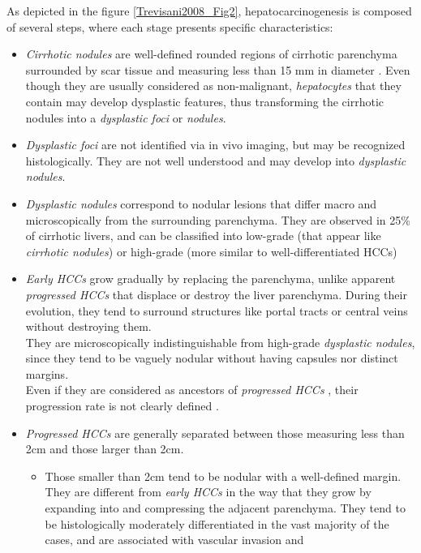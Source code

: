 As depicted in the figure \ref{Trevisani2008_Fig2}, hepatocarcinogenesis is composed of
several steps, where each stage presents specific characteristics:
\begin{itemize}
\item \emph{Cirrhotic nodules} are well-defined rounded regions of cirrhotic
  parenchyma surrounded by scar tissue and measuring less than 15 mm in
  diameter \cite{Zimmermann1995}. Even though they are
  usually considered as non-malignant, \emph{hepatocytes} that they
  contain may develop dysplastic features, thus transforming the
  cirrhotic nodules into a \emph{dysplastic foci} or \emph{nodules}.
\item \emph{Dysplastic foci} are not identified via in vivo imaging, but may
  be recognized histologically. They are not well understood and may
  develop into \emph{dysplastic nodules}.
\item \emph{Dysplastic nodules} correspond to nodular lesions that differ
  macro and microscopically from the surrounding parenchyma. They are
  observed in 25\% of cirrhotic livers, and can be classified into
  low-grade (that appear like \emph{cirrhotic nodules}) or high-grade (more
  similar to well-differentiated HCCs)
\item \emph{Early HCCs} grow gradually by replacing the parenchyma, unlike
  apparent \emph{progressed HCCs} that displace or destroy the liver
  parenchyma. During their evolution, they tend to surround structures
  like portal tracts or central veins without destroying them.\\
  They are microscopically indistinguishable from high-grade \emph{dysplastic
  nodules}, since they tend to be vaguely nodular without having capsules
  nor distinct margins.\\
  Even if they are considered as ancestors of \emph{progressed HCCs} \cite{Park2011}, their progression rate is not
  clearly defined \cite{Khalili2011}.
\item \emph{Progressed HCCs} are generally separated between those measuring
  less than 2cm and those larger than 2cm.
  \begin{itemize}
  \item Those smaller than 2cm tend to be nodular with a well-defined
    margin. They are different from \emph{early HCCs} in the way that
    they grow by expanding into and compressing the adjacent parenchyma.
    They tend to be histologically moderately differentiated in the vast
    majority of the cases, and are associated with vascular invasion and

\end{itemize}
\end{itemize}
